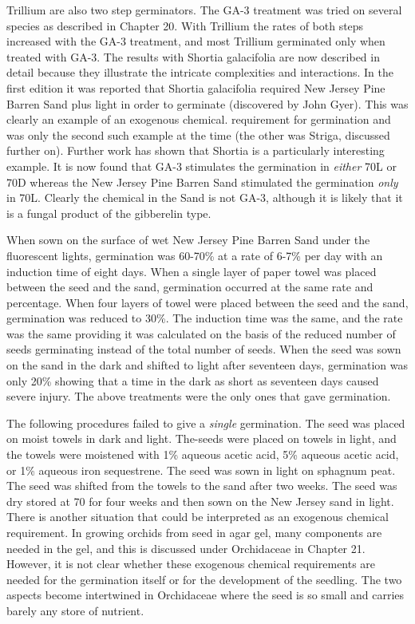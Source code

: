 Trillium are also two step germinators. The GA-3 treatment was tried on several
species as described in Chapter 20. With Trillium the rates of both steps increased
with the GA-3 treatment, and most Trillium germinated only when treated with GA-3.
The results with Shortia galacifolia are now described in detail because they
illustrate the intricate complexities and interactions. In the first edition it was reported
that Shortia galacifolia required New Jersey Pine Barren Sand plus light in order to
germinate (discovered by John Gyer). This was clearly an example of an exogenous
chemical. requirement for germination and was only the second such example at the
time (the other was Striga, discussed further on). Further work has shown that Shortia
is a particularly interesting example. It is now found that GA-3 stimulates the
germination in \textit{either} 70L or 70D whereas the New Jersey Pine Barren Sand
stimulated the germination \textit{only} in 70L. Clearly the chemical in the Sand is not GA-3,
although it is likely that it is a fungal product of the gibberelin type.

When sown on the surface of wet New Jersey Pine Barren Sand under the
fluorescent lights, germination was 60-70\% at a rate of 6-7\% per day with an induction
time of eight days. When a single layer of paper towel was placed between the seed
and the sand, germination occurred at the same rate and percentage. When four
layers of towel were placed between the seed and the sand, germination was reduced
to 30\%. The induction time was the same, and the rate was the same providing it was
calculated on the basis of the reduced number of seeds germinating instead of the
total number of seeds. When the seed was sown on the sand in the dark and shifted to
light after seventeen days, germination was only 20\% showing that a time in the dark
as short as seventeen days caused severe injury. The above treatments were the only
ones that gave germination.

The following procedures failed to give a \textit{single} germination. The seed was
placed on moist towels in dark and light. The-seeds were placed on towels in light,
and the towels were moistened with 1\% aqueous acetic acid, 5\% aqueous acetic acid,
or 1\% aqueous iron sequestrene. The seed was sown in light on sphagnum peat.
The seed was shifted from the towels to the sand after two weeks. The seed was dry
stored at 70 for four weeks and then sown on the New Jersey sand in light.
There is another situation that could be interpreted as an exogenous chemical
requirement. In growing orchids from seed in agar gel, many components are needed
in the gel, and this is discussed under Orchidaceae in Chapter 21. However, it is not
clear whether these exogenous chemical requirements are needed for the
germination itself or for the development of the seedling. The two aspects become
intertwined in Orchidaceae where the seed is so small and carries barely any store of
nutrient.

